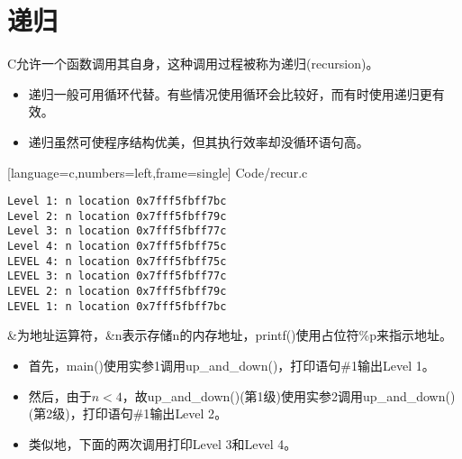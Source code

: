 \section{递归}

\begin{frame}[fragile]\ft{\secname}
C允许一个函数调用其自身，这种调用过程被称为递归(recursion)。 
\vspace{0.1in}

\begin{itemize}
\item 递归一般可用循环代替。有些情况使用循环会比较好，而有时使用递归更有效。\\[0.1in]
\item 递归虽然可使程序结构优美，但其执行效率却没循环语句高。
\end{itemize}
\end{frame}


\begin{frame}\ft{\secname}
  
  [language=c,numbers=left,frame=single]
  {Code/recur.c}
\end{frame}


\begin{frame}[fragile]\ft{\secname}
\begin{lstlisting}[backgroundcolor=\color{red!10}]
Level 1: n location 0x7fff5fbff7bc
Level 2: n location 0x7fff5fbff79c
Level 3: n location 0x7fff5fbff77c
Level 4: n location 0x7fff5fbff75c
LEVEL 4: n location 0x7fff5fbff75c
LEVEL 3: n location 0x7fff5fbff77c
LEVEL 2: n location 0x7fff5fbff79c
LEVEL 1: n location 0x7fff5fbff7bc
\end{lstlisting}
\end{frame}


\begin{frame}[fragile]\ft{\secname}
{\tf \&}为地址运算符，{\tf \&n}表示存储n的内存地址，{\tf printf()}使用占位符{\tf \%p}来指示地址。
\end{frame}


\begin{frame}[fragile]
\begin{itemize}
\item 首先，{\tf main()}使用实参1调用{\tf up\_and\_down()}，打印语句{\tf \#1}输出{\tf Level 1}。\\[0.1in]
\item 然后，由于$n<4$，故{\tf up\_and\_down()}(第1级)使用实参2调用{\tf up\_and\_down()}(第2级)，打印语句{\tf \#1}输出{\tf Level 2}。\\[0.1in]
\item 类似地，下面的两次调用打印{\tf Level 3}和{\tf Level 4}。
\end{itemize}
\end{frame}

